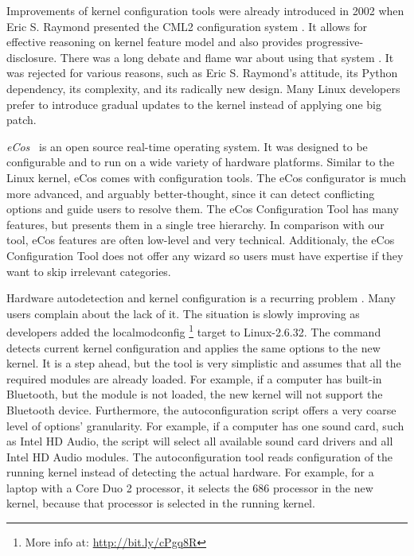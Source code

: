 \documentclass{chi2009}
\begin{document}
Improvements of kernel configuration tools were already introduced in 2002 when Eric S. Raymond presented the CML2 configuration system
\cite{raymond:cml2:2000}. It allows for effective reasoning on kernel feature model and also provides progressive-disclosure. There was a long debate and flame
war about using that system \cite{kerneltrap:linux:2002}. It was rejected for various reasons, such as Eric S. Raymond's attitude, its Python dependency, its
complexity, and its radically new design. Many Linux developers prefer to introduce gradual updates to the kernel instead of applying one big patch.

\textit{eCos}~\cite{veer:ecos:2000} is an open source real-time operating system. It was designed to be configurable and to run on a wide variety of hardware
platforms. Similar to the Linux kernel, eCos comes with configuration tools. The eCos configurator is much more advanced, and arguably better-thought, since
it can detect conflicting options and guide users to resolve them. The eCos Configuration Tool has many features, but presents them in a single tree hierarchy.
In comparison with our tool, eCos features are often low-level and very technical. Additionaly, the eCos Configuration Tool does not offer any wizard so users
must have expertise if they want to skip irrelevant categories.

Hardware autodetection and kernel configuration is a recurring problem \cite{debian:config:2010,soft32:config:2007}. Many users complain about the lack of it.
The situation is slowly improving as developers added the \textsf{localmodconfig} \footnote{More info at: \url{http://bit.ly/cPgq8R}} target to Linux-2.6.32.
The command detects current kernel configuration and applies the same options to the new kernel. It is a step ahead, but the tool is very simplistic and assumes
that all the required modules are already loaded. For example, if a computer has built-in Bluetooth, but the module is not loaded, the new kernel will not
support the Bluetooth device. Furthermore, the autoconfiguration script offers a very coarse level of options' granularity. For example, if a computer has one
sound card, such as Intel HD Audio, the script will select all available sound card drivers and all Intel HD Audio modules. The autoconfiguration tool reads
configuration of the running kernel instead of detecting the actual hardware. For example, for a laptop with a Core Duo 2 processor, it selects the 686
processor in the new kernel, because that processor is selected in the running kernel.
\end{document}
